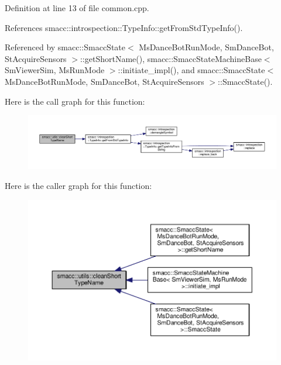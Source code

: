 Definition at line 13 of file common.\+cpp.



References smacc\+::introspection\+::\+Type\+Info\+::get\+From\+Std\+Type\+Info().



Referenced by smacc\+::\+Smacc\+State$<$ Ms\+Dance\+Bot\+Run\+Mode, Sm\+Dance\+Bot, St\+Acquire\+Sensors $>$\+::get\+Short\+Name(), smacc\+::\+Smacc\+State\+Machine\+Base$<$ Sm\+Viewer\+Sim, Ms\+Run\+Mode $>$\+::initiate\+\_\+impl(), and smacc\+::\+Smacc\+State$<$ Ms\+Dance\+Bot\+Run\+Mode, Sm\+Dance\+Bot, St\+Acquire\+Sensors $>$\+::\+Smacc\+State().




Here is the call graph for this function\+:\nopagebreak
\begin{figure}[H]
\begin{center}
\leavevmode
\includegraphics[width=350pt]{namespacesmacc_1_1utils_aacd1975bb7cd9bec4b50e111a2ae7edb_cgraph}
\end{center}
\end{figure}




Here is the caller graph for this function\+:\nopagebreak
\begin{figure}[H]
\begin{center}
\leavevmode
\includegraphics[width=350pt]{namespacesmacc_1_1utils_aacd1975bb7cd9bec4b50e111a2ae7edb_icgraph}
\end{center}
\end{figure}


